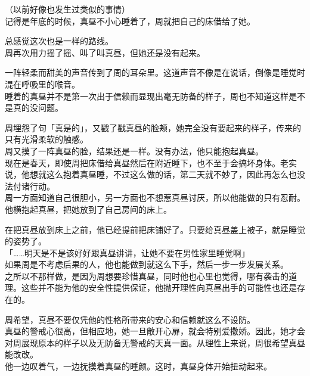 （以前好像也发生过类似的事情）\\

记得是年底的时候，真昼不小心睡着了，周就把自己的床借给了她。

总感觉这次也是一样的路线。\\

周再次用力摇了摇、叫了叫真昼，但她还是没有起来。

一阵轻柔而甜美的声音传到了周的耳朵里。这道声音不像是在说话，倒像是睡觉时混在呼吸里的喉音。\\

睡着的真昼并不是第一次出于信赖而显现出毫无防备的样子，周也不知道这样是不是真的没问题。

周埋怨了句「真是的」，又戳了戳真昼的脸颊，她完全没有要起来的样子，传来的只有光滑柔软的触感。\\

周又摸了一阵真昼的脸，结果还是一样。没有办法，他只能抱起真昼。\\

现在是春天，即使周把床借给真昼然后在附近睡下，也不至于会搞坏身体。老实说，他想就这么抱着真昼睡，不过这么做的话，第二天就不妙了，因此再怎么也没法付诸行动。\\

周一方面知道自己很胆小，另一方面也不想惹真昼讨厌，所以他能做的只有忍耐。他横抱起真昼，把她放到了自己房间的床上。

在把真昼放到床上之前，他已经提前把床铺好了。只要给真昼盖上被子，就是睡觉的姿势了。\\

「……明天是不是该好好跟真昼讲讲，让她不要在男性家里睡觉啊」\\

如果周是不考虑后果的人，他也能做到就这么下手，然后一步一步发展关系。\\

之所以不那样做，是因为周想要珍惜真昼，同时他也心里也觉得，哪有袭击的道理。这些并不能为他的安全性提供保证，他抛开理性向真昼出手的可能性也还是存在的。

周希望，真昼不要仅凭他的性格所带来的安心和信赖就这么不设防。\\

真昼的警戒心很高，但相应地，她一旦敞开心扉，就会特别爱撒娇。因此，她才会对周展现原本的样子以及无防备无警戒的天真一面。从理性上来说，周很希望真昼能改改。\\

他一边叹着气，一边抚摸着真昼的睡颜。这时，真昼身体开始扭动起来。\\

